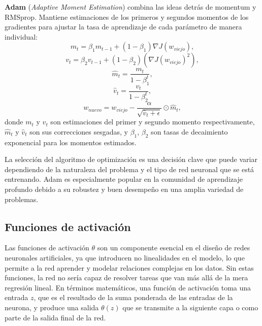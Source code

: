 \textbf{Adam} (\textit{Adaptive Moment Estimation}) combina las ideas detrás de momentum y RMSprop. Mantiene estimaciones de los primeros y segundos momentos de los gradientes para ajustar la tasa de aprendizaje de cada parámetro de manera individual:
\begin{equation}
	m_{t} = \beta_1 m_{t-1} + (1 - \beta_1)\nabla J(w_{viejo}),
\end{equation}
\begin{equation}
	v_{t} = \beta_2 v_{t-1} + (1 - \beta_2)(\nabla J(w_{viejo})^2),
\end{equation}
\begin{equation}
	\hat{m}_{t} = \frac{m_{t}}{1 - \beta_1^t},
\end{equation}
\begin{equation}
	\hat{v}_{t} = \frac{v_{t}}{1 - \beta_2^t},
\end{equation}
\begin{equation}
	w_{nuevo} = w_{viejo} - \frac{\alpha}{\sqrt{\hat{v}_{t} + \epsilon}} \odot \hat{m}_{t},
\end{equation}
donde $m_{t}$ y $v_{t}$ son estimaciones del primer y segundo momento respectivamente, $\hat{m}_{t}$ y $\hat{v}_{t}$ son sus correcciones sesgadas, y $\beta_1$, $\beta_2$ son tasas de decaimiento exponencial para los momentos estimados.

La selección del algoritmo de optimización es una decisión clave que puede variar dependiendo de la naturaleza del problema y el tipo de red neuronal que se está entrenando. Adam es especialmente popular en la comunidad de aprendizaje profundo debido a su robustez y buen desempeño en una amplia variedad de problemas.

\subsection{Funciones de activación}

Las funciones de activación $\theta$ son un componente esencial en el diseño de redes neuronales artificiales, ya que introducen no linealidades en el modelo, lo que permite a la red aprender y modelar relaciones complejas en los datos. Sin estas funciones, la red no sería capaz de resolver tareas que van más allá de la mera regresión lineal. En términos matemáticos, una función de activación toma una entrada $z$, que es el resultado de la suma ponderada de las entradas de la neurona, y produce una salida $\theta(z)$ que se transmite a la siguiente capa o como parte de la salida final de la red.

